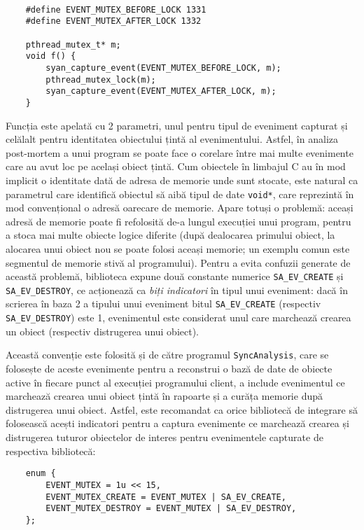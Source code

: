 \begin{lstlisting}[caption=Exemplul folosit în proiectarea interfeței,
                   label=code:library-interface-example]

    #define EVENT_MUTEX_BEFORE_LOCK 1331
    #define EVENT_MUTEX_AFTER_LOCK 1332

    pthread_mutex_t* m;
    void f() {
        syan_capture_event(EVENT_MUTEX_BEFORE_LOCK, m);
        pthread_mutex_lock(m);
        syan_capture_event(EVENT_MUTEX_AFTER_LOCK, m);
    }
\end{lstlisting}

Funcția este apelată cu 2 parametri, unul pentru tipul de eveniment
capturat și celălalt pentru identitatea obiectului țintă al
evenimentului. Astfel, în analiza post-mortem a unui program se poate
face o corelare între mai multe evenimente care au avut loc pe același
obiect țintă. Cum obiectele în limbajul C au în mod implicit o
identitate dată de adresa de memorie unde sunt stocate, este natural ca
parametrul care identifică obiectul să aibă tipul de date
\lstinline{void*}, care reprezintă în mod convențional o adresă oarecare
de memorie. Apare totuși o problemă: aceași adresă de memorie poate fi
refolosită de-a lungul execuției unui program, pentru a stoca mai multe
obiecte logice diferite (după dealocarea primului obiect, la alocarea
unui obiect nou se poate folosi aceași memorie; un exemplu comun este
segmentul de memorie stivă al programului). Pentru a evita confuzii
generate de această problemă, biblioteca expune două constante numerice
\lstinline{SA_EV_CREATE} și \lstinline{SA_EV_DESTROY}, ce acționează ca
\textit{biți indicatori} în tipul unui eveniment: dacă în scrierea în
baza 2 a tipului unui eveniment bitul \lstinline{SA_EV_CREATE}
(respectiv \lstinline{SA_EV_DESTROY}) este 1, evenimentul este
considerat unul care marchează crearea un obiect (respectiv distrugerea
unui obiect).

Această convenție este folosită și de către programul
\lstinline{SyncAnalysis}, care se folosește de aceste evenimente pentru
a reconstrui o bază de date de obiecte active în fiecare punct al
execuției programului client, a include evenimentul ce marchează
crearea unui obiect țintă în rapoarte și a curăța memorie după
distrugerea unui obiect. Astfel, este recomandat ca orice bibliotecă de
integrare să folosească acești indicatori pentru a captura evenimente ce
marchează crearea și distrugerea tuturor obiectelor de interes pentru
evenimentele capturate de respectiva bibliotecă:
\begin{lstlisting}
    enum {
        EVENT_MUTEX = 1u << 15,
        EVENT_MUTEX_CREATE = EVENT_MUTEX | SA_EV_CREATE,
        EVENT_MUTEX_DESTROY = EVENT_MUTEX | SA_EV_DESTROY,
    };
\end{lstlisting}


